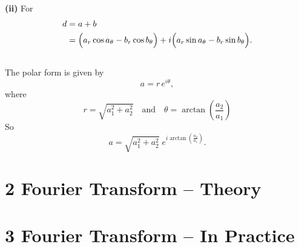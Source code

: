 \documentclass[12pt]{article}
\begin{document}
\textbf{(ii)} For 
\begin{equation}
\begin{aligned}
d &= a + b\\
& = \Bigl(a_r\cos a_\theta - b_r\cos b_\theta\Bigr) + i\Bigl(a_r\sin a_\theta - b_r\sin b_\theta\Bigr).
\end{aligned}
\end{equation}
\subsection{}

The polar form is given by
\[
a = r\, e^{i\theta},
\]
where
\[
r = \sqrt{a_1^2 + a_2^2} \quad \text{and} \quad \theta = \arctan\!\left(\frac{a_2}{a_1}\right)
\]
So
\[
a = \sqrt{a_1^2+a_2^2}\; e^{i\arctan\!\left(\frac{a_2}{a_1}\right)}.
\]


\section{2 Fourier Transform – Theory}

\section{3 Fourier Transform – In Practice}
\end{document}
